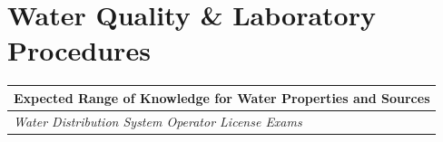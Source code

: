 
\chapter{Water Quality \& Laboratory Procedures}





\begin{table}[H]
\begin{tabular}{| m{1cm} | m{15cm} |}
\hline
\multicolumn{2}{|l|}{\textbf{Expected   Range of Knowledge for Water Properties and Sources}}                                                                          \\ \hline
\multicolumn{2}{|l|}{\textit{Water   Distribution System Operator License Exams}}                                                                                      \\ \hline


\end{tabular}
\end{table}
